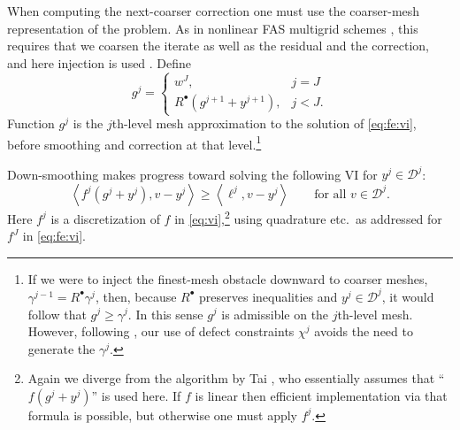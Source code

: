 \documentclass[letterpaper,final,12pt,reqno]{amsart}
\theoremstyle{cstyle}
\theoremstyle{cstyle*}
\theoremstyle{dstyle}
\numberwithin{equation}{section}
\numberwithin{figure}{section}
\numberwithin{table}{section}
\numberwithin{theorem}{section}
\newcommand{\ip}[2]{\left<#1,#2\right>}
\newcommand{\iR}{R^{\bullet}}
\begin{document}
When computing the next-coarser correction one must use the coarser-mesh representation of the problem.  As in nonlinear FAS multigrid schemes \cite{BrandtLivne2011,Bruneetal2015,Trottenbergetal2001}, this requires that we coarsen the iterate as well as the residual and the correction, and here injection is used \cite[section 5.3]{Trottenbergetal2001}.  Define
\begin{equation}
g^j = \begin{cases} w^J, & j=J \\
                    \iR(g^{j+1} + y^{j+1}), & j < J.
      \end{cases}  \label{eq:fe:defineg}
\end{equation}
Function $g^j$ is the $j$th-level mesh approximation to the solution of \eqref{eq:fe:vi}, before smoothing and correction at that level.\footnote{If we were to inject the finest-mesh obstacle downward to coarser meshes, $\gamma^{j-1} = \iR \gamma^j$, then, because $\iR$ preserves inequalities and $y^j \in \mathcal{D}^j$, it would follow that $g^j \ge \gamma^j$.  In this sense $g^j$ is admissible on the $j$th-level mesh.  However, following \cite{GraeserKornhuber2009}, our use of defect constraints $\chi^j$ avoids the need to generate the $\gamma^j$.}

Down-smoothing makes progress toward solving the following VI for $y^j \in \mathcal{D}^j$:
\begin{equation}
\ip{f^j(g^j + y^j)}{v-y^j} \ge \ip{\ell^j}{v-y^j} \qquad \text{for all } v\in \mathcal{D}^j. \label{eq:fe:downvi}
\end{equation}
Here $f^j$ is a discretization of $f$ in \eqref{eq:vi},\footnote{Again we diverge from the algorithm by Tai \cite{Tai2003}, who essentially assumes that ``$f(g^j + y^j)$'' is used here.  If $f$ is linear then efficient implementation via that formula is possible, but otherwise one must apply $f^j$.} using quadrature etc.~as addressed for $f^J$ in \eqref{eq:fe:vi}.
\end{document}
